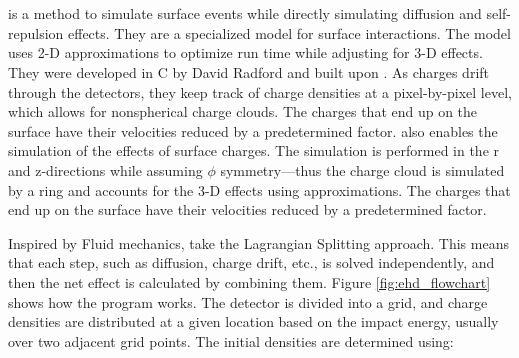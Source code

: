 


\section{{\ehd}}
{\ehd} is a method to simulate surface events while directly simulating diffusion and self-repulsion effects. They are a specialized model for surface interactions. The model uses 2-D approximations to optimize run time while adjusting for 3-D effects. They were developed in C by David Radford and built upon {\siggen}. As charges drift through the detectors, they keep track of charge densities at a pixel-by-pixel level, which allows for nonspherical charge clouds. The charges that end up on the surface have their velocities reduced by a predetermined factor. {\ehd} also enables the simulation of the effects of surface charges. The simulation is performed in the r and z-directions while assuming $\phi$ symmetry—thus the charge cloud is simulated by a ring and accounts for the 3-D effects using approximations. The charges that end up on the surface have their velocities reduced by a predetermined factor.

Inspired by Fluid mechanics, {\ehd} take the Lagrangian Splitting approach. This means that each step, such as diffusion, charge drift, etc., is solved independently, and then the net effect is calculated by combining them. Figure \ref{fig:ehd_flowchart} shows how the {\ehd} program works. The detector is divided into a grid, and charge densities are distributed at a given location based on the impact energy, usually over two adjacent grid points. The initial densities are determined using:

